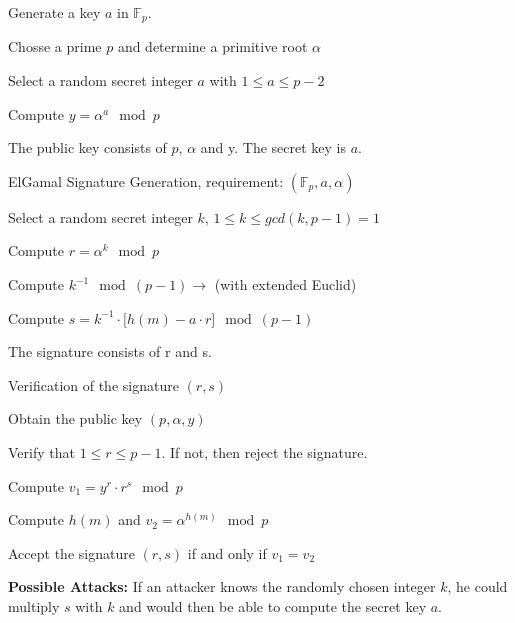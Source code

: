 Generate a key $a$ in $\mathbb{F}_p$.
\begin{aufzaehlung}
\item Chosse a prime $p$ and determine a primitive root $\alpha$
\item Select a random secret integer $a$ with $1 \leq a \leq p-2$
\item Compute $y=\alpha^a \mod p$
\item The public key consists of $p$, $\alpha$ and y. The secret key is $a$.
\end{aufzaehlung}

ElGamal Signature Generation, requirement: $(\mathbb{F}_p, a, \alpha)$
\begin{aufzaehlung}
  	\item  Select a random secret integer $k$, $1 \leq k \leq gcd(k,p-1)=1$ 
  	\item  Compute $r=\alpha^k \mod p$ 
  	\item  Compute $k^{-1} \mod (p-1) \to$ (with extended Euclid)
  	\item  Compute $s=k^{-1} \cdot \lbrack h(m) - a \cdot r \rbrack \mod (p-1)$
  	\item  The signature consists of r and s.
\end{aufzaehlung}

Verification of the signature $(r,s)$
\begin{aufzaehlung}
  \item   Obtain the public key $(p,\alpha,y)$
  \item   Verify that $1 \leq r \leq p-1$. If not, then reject the signature.
  \item   Compute $v_1=y^r \cdot r^s \mod p$
  \item   Compute $h(m)$ and $v_2=\alpha^{h(m)} \mod p$
  \item   Accept the signature $(r,s)$ if and only if $v_1=v_2$
\end{aufzaehlung}

\textbf{Possible Attacks:} If an attacker knows the randomly chosen integer $k$, he could multiply $s$ with $k$ and would then be able to compute the secret key $a$.



